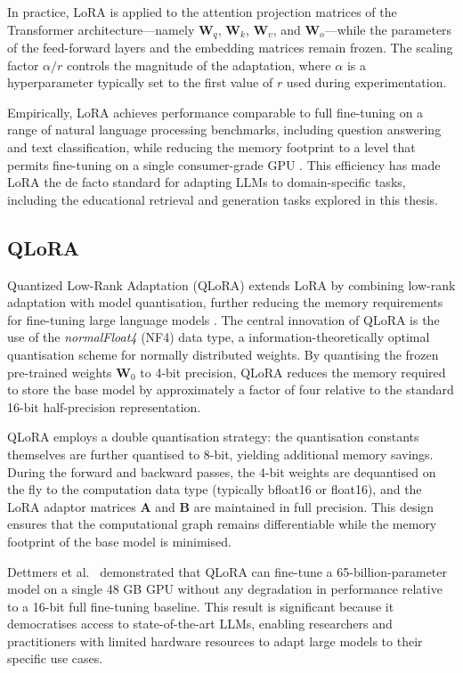 In practice, LoRA is applied to the attention projection matrices of the Transformer architecture---namely \(\mathbf{W}_q\), \(\mathbf{W}_k\), \(\mathbf{W}_v\), and \(\mathbf{W}_o\)---while the parameters of the feed-forward layers and the embedding matrices remain frozen. The scaling factor \(\alpha / r\) controls the magnitude of the adaptation, where \(\alpha\) is a hyperparameter typically set to the first value of \(r\) used during experimentation.

Empirically, LoRA achieves performance comparable to full fine-tuning on a range of natural language processing benchmarks, including question answering and text classification, while reducing the memory footprint to a level that permits fine-tuning on a single consumer-grade GPU \cite{hu2022lora}. This efficiency has made LoRA the de facto standard for adapting LLMs to domain-specific tasks, including the educational retrieval and generation tasks explored in this thesis.

\subsection{QLoRA}

Quantized Low-Rank Adaptation (QLoRA) extends LoRA by combining low-rank adaptation with model quantisation, further reducing the memory requirements for fine-tuning large language models \cite{dettmers2023qlora}. The central innovation of QLoRA is the use of the \emph{normalFloat4} (NF4) data type, a information-theoretically optimal quantisation scheme for normally distributed weights. By quantising the frozen pre-trained weights \(\mathbf{W}_0\) to 4-bit precision, QLoRA reduces the memory required to store the base model by approximately a factor of four relative to the standard 16-bit half-precision representation.

QLoRA employs a double quantisation strategy: the quantisation constants themselves are further quantised to 8-bit, yielding additional memory savings. During the forward and backward passes, the 4-bit weights are dequantised on the fly to the computation data type (typically bfloat16 or float16), and the LoRA adaptor matrices \(\mathbf{A}\) and \(\mathbf{B}\) are maintained in full precision. This design ensures that the computational graph remains differentiable while the memory footprint of the base model is minimised.

Dettmers et al.\ \cite{dettmers2023qlora} demonstrated that QLoRA can fine-tune a 65-billion-parameter model on a single 48 GB GPU without any degradation in performance relative to a 16-bit full fine-tuning baseline. This result is significant because it democratises access to state-of-the-art LLMs, enabling researchers and practitioners with limited hardware resources to adapt large models to their specific use cases.

